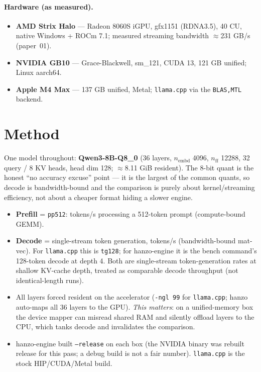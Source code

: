 \documentclass[11pt]{article}
\begin{document}
\paragraph{Hardware (as measured).}
\begin{itemize}[noitemsep]
  \item \textbf{AMD Strix Halo} --- Radeon 8060S iGPU, gfx1151 (RDNA3.5), 40 CU, native
        Windows + ROCm 7.1; measured streaming bandwidth $\approx$231 GB/s (paper~01).
  \item \textbf{NVIDIA GB10} --- Grace-Blackwell, sm\_121, CUDA 13, 121 GB unified; Linux aarch64.
  \item \textbf{Apple M4 Max} --- 137 GB unified, Metal; \texttt{llama.cpp} via the \texttt{BLAS,MTL} backend.
\end{itemize}

\section{Method}
One model throughout: \textbf{Qwen3-8B-Q8\_0} (36 layers, $n_\text{embd}$ 4096, $n_\text{ff}$ 12288,
32 query / 8 KV heads, head dim 128; $\approx$8.11 GiB resident). The 8-bit quant is the honest
``no accuracy excuse'' point --- it is the largest of the common quants, so decode is
bandwidth-bound and the comparison is purely about kernel/streaming efficiency, not about a
cheaper format hiding a slower engine.

\begin{itemize}[noitemsep]
  \item \textbf{Prefill} = \texttt{pp512}: tokens/s processing a 512-token prompt (compute-bound GEMM).
  \item \textbf{Decode} = single-stream token generation, tokens/s (bandwidth-bound mat-vec).
        For \texttt{llama.cpp} this is \texttt{tg128}; for hanzo-engine it is the bench command's
        128-token decode at depth 4. Both are single-stream token-generation rates at shallow
        KV-cache depth, treated as comparable decode throughput (not identical-length runs).
  \item All layers forced resident on the accelerator (\texttt{-ngl 99} for \texttt{llama.cpp};
        hanzo auto-maps all 36 layers to the GPU). \emph{This matters}: on a unified-memory box the
        device mapper can misread shared RAM and silently offload layers to the CPU, which tanks
        decode and invalidates the comparison.
  \item hanzo-engine built \texttt{--release} on each box (the NVIDIA binary was rebuilt release for
        this pass; a debug build is not a fair number). \texttt{llama.cpp} is the stock HIP/CUDA/Metal build.
\end{itemize}
\end{document}
